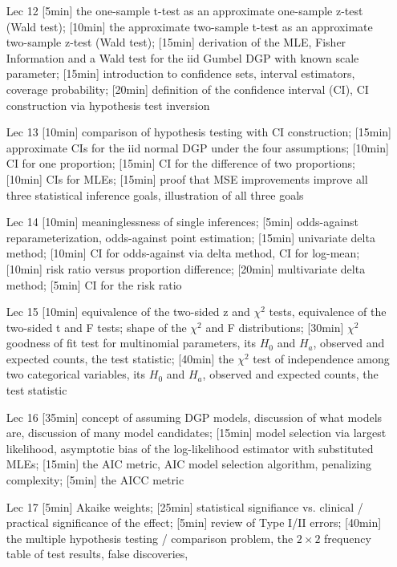 \begin{enumerate}
\item[Lec 12] [5min] the one-sample t-test as an approximate one-sample z-test (Wald test); [10min] the approximate two-sample t-test as an approximate two-sample z-test (Wald test); [15min] derivation of the MLE, Fisher Information and a Wald test for the iid Gumbel DGP with known scale parameter; [15min] introduction to confidence sets, interval estimators, coverage probability; [20min] definition of the confidence interval (CI), CI construction via hypothesis test inversion

\item[Lec 13] [10min] comparison of hypothesis testing with CI construction; [15min] approximate CIs for the iid normal DGP under the four assumptions; [10min] CI for one proportion; [15min] CI for the difference of two proportions; [10min] CIs for MLEs; [15min] proof that MSE improvements improve all three statistical inference goals, illustration of all three goals

\item[Lec 14] [10min] meaninglessness of single inferences; [5min] odds-against reparameterization, odds-against point estimation; [15min] univariate delta method; [10min] CI for odds-against via delta method, CI for log-mean; [10min] risk ratio versus proportion difference; [20min] multivariate delta method; [5min] CI for the risk ratio

\item[Lec 15] [10min] equivalence of the two-sided z and $\chi^2$ tests, equivalence of the two-sided t and F tests; shape of the $\chi^2$ and F distributions; [30min] $\chi^2$ goodness of fit test for multinomial parameters, its $H_0$ and $H_a$, observed and expected counts, the test statistic; [40min] the $\chi^2$ test of independence among two categorical variables, its $H_0$ and $H_a$, observed and expected counts, the test statistic

\item[Lec 16] [35min] concept of assuming DGP models, discussion of what models are, discussion of many model candidates; [15min] model selection via largest likelihood, asymptotic bias of the log-likelihood estimator with substituted MLEs; [15min] the AIC metric, AIC model selection algorithm, penalizing complexity; [5min] the AICC metric

\item[Lec 17] [5min] Akaike weights; [25min] statistical signifiance vs. clinical / practical significance of the effect; [5min] review of Type I/II errors; [40min] the multiple hypothesis testing / comparison problem, the $2 \times 2$ frequency table of test results, false discoveries,  


\end{enumerate}
